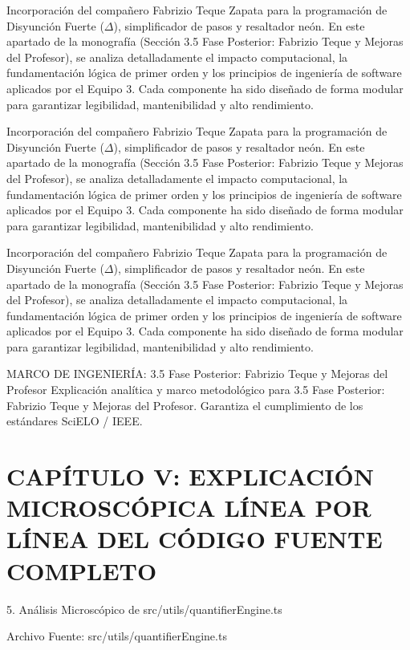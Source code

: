 \documentclass[11pt,a4paper]{article}
\begin{document}
Incorporación del compañero Fabrizio Teque Zapata para la programación
de Disyunción Fuerte ($ \Delta $), simplificador de pasos y resaltador neón. En
este apartado de la monografía (Sección 3.5 Fase Posterior: Fabrizio
Teque y Mejoras del Profesor), se analiza detalladamente el impacto
computacional, la fundamentación lógica de primer orden y los principios
de ingeniería de software aplicados por el Equipo 3. Cada componente ha
sido diseñado de forma modular para garantizar legibilidad,
mantenibilidad y alto rendimiento.

Incorporación del compañero Fabrizio Teque Zapata para la programación
de Disyunción Fuerte ($ \Delta $), simplificador de pasos y resaltador neón. En
este apartado de la monografía (Sección 3.5 Fase Posterior: Fabrizio
Teque y Mejoras del Profesor), se analiza detalladamente el impacto
computacional, la fundamentación lógica de primer orden y los principios
de ingeniería de software aplicados por el Equipo 3. Cada componente ha
sido diseñado de forma modular para garantizar legibilidad,
mantenibilidad y alto rendimiento.

Incorporación del compañero Fabrizio Teque Zapata para la programación
de Disyunción Fuerte ($ \Delta $), simplificador de pasos y resaltador neón. En
este apartado de la monografía (Sección 3.5 Fase Posterior: Fabrizio
Teque y Mejoras del Profesor), se analiza detalladamente el impacto
computacional, la fundamentación lógica de primer orden y los principios
de ingeniería de software aplicados por el Equipo 3. Cada componente ha
sido diseñado de forma modular para garantizar legibilidad,
mantenibilidad y alto rendimiento.

\medskip\hrulefill\medskip
 MARCO DE INGENIERÍA: 3.5 Fase Posterior: Fabrizio Teque y Mejoras
del Profesor
Explicación analítica y marco metodológico para 3.5 Fase Posterior:
Fabrizio Teque y Mejoras del Profesor. Garantiza el cumplimiento de los
estándares SciELO / IEEE.
\medskip\hrulefill\medskip

\medskip\hrulefill\medskip

\section{CAPÍTULO V: EXPLICACIÓN MICROSCÓPICA LÍNEA POR LÍNEA DEL CÓDIGO FUENTE COMPLETO}

5. Análisis Microscópico de src/utils/quantifierEngine.ts

 Archivo Fuente: src/utils/quantifierEngine.ts
\end{document}

